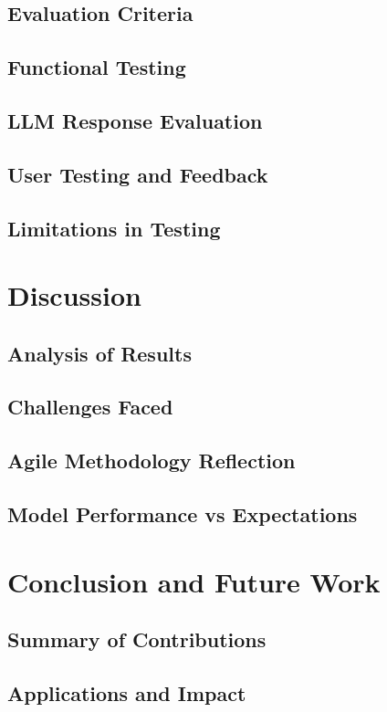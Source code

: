 \documentclass[12pt,a4paper]{report}
\begin{document}
\section{Evaluation Criteria}
\section{Functional Testing}
\section{LLM Response Evaluation}
\section{User Testing and Feedback}
\section{Limitations in Testing}

\chapter{Discussion}  %
\section{Analysis of Results}
\section{Challenges Faced}
\section{Agile Methodology Reflection}
\section{Model Performance vs Expectations}

\chapter{Conclusion and Future Work}  %
\section{Summary of Contributions}
\section{Applications and Impact}
\end{document}
